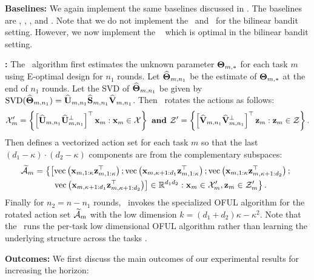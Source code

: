 \textbf{Baselines:} We again implement the same baselines discussed in . The baselines are \pred, \predt, \dptg, and \ts. 
%
Note that we do not implement the \linucb\ and \mlin\ for the bilinear bandit setting.
%
However, we now implement the \estr\ \citep{jun2019bilinear} which is optimal in the bilinear bandit setting. 


\textbf{\estr:} The \estr\ algorithm first estimates the unknown parameter $\mathbf{\Theta}_{m,*}$ for each task $m$ using E-optimal design \citep{pukelsheim2006optimal, fedorov2013theory, jun2019bilinear} for $n_1$ rounds. Let $\widehat{\mathbf{\Theta}}_{m,n_1}$ be the estimate of $\mathbf{\Theta}_{m,*}$ at the end of $n_1$ rounds. Let the SVD of $\widehat{\mathbf{\Theta}}_{m,n_1}$ be given by $\operatorname{SVD}(\widehat{\mathbf{\Theta}}_{m,n_1}) = \widehat{\mathbf{U}}_{m,n_1}\widehat{\mathbf{S}}_{m, n_1}\widehat{\mathbf{V}}_{m, n_1}$.
%
Then \estr\ rotates the actions as follows:
\begin{align*}
    \mathcal{X}^{\prime}_m=\left\{\left[\widehat{\mathbf{U}}_{m,n_1} \widehat{\mathbf{U}}^{\perp}_{m,n_1}\right]^{\top} \mathbf{x}_m: \mathbf{x}_m \in \mathcal{X}\right\} \textbf{ and } \mathcal{Z}^{\prime}=\left\{\left[\widehat{\mathbf{V}}_{m,n_1} \widehat{\mathbf{V}}^{\perp}_{m,n_1}\right]^{\top} \mathbf{z}_m: \mathbf{z}_m \in \mathcal{Z}\right\}.
\end{align*}
Then defines a vectorized action set for each task $m$ so that the last $\left(d_1-\kappa\right) \cdot\left(d_2-\kappa\right)$ components are from the complementary subspaces:
\begin{align*}
\widetilde{\mathcal{A}}_m&=\left\{\left[\operatorname{vec}\left(\mathbf{x}_{m, 1: \kappa} \mathbf{z}_{m, 1: \kappa}^{\top}\right) ; \operatorname{vec}\left(\mathbf{x}_{m, \kappa+1: d_1} \mathbf{z}_{m, 1: \kappa}^{\top}\right) ; \operatorname{vec}\left(\mathbf{x}_{m, 1: \kappa} \mathbf{z}_{m, \kappa+1: d_2}^{\top}\right) ; \right.\right.\\
&\quad\quad\left.\left.\operatorname{vec}\left(\mathbf{x}_{m, \kappa+1: d_1} \mathbf{z}_{m, \kappa+1: d_2}^{\top}\right)\right] \in \mathbb{R}^{d_1 d_2}: \mathbf{x}_m \in \mathcal{X}^{\prime}_m, \mathbf{z}_m \in \mathcal{Z}^{\prime}_m\right\} .
\end{align*}
%
Finally for $n_2=n-n_1$ rounds, \estr\ invokes the specialized OFUL algorithm \citep{abbasi2011improved}  for the rotated action set $\widetilde{\mathcal{A}}_m$ with the low dimension $k=\left(d_1+d_2\right) \kappa-\kappa^2$.
%
Note that the \estr\ runs the per-task low dimensional OFUL algorithm rather than learning the underlying structure across the tasks \citep{mukherjee2023multi}. 

\textbf{Outcomes:} We first discuss the main outcomes of our experimental results for increasing the horizon:

